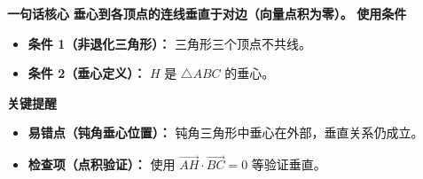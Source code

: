 \begin{summarybox}
	\textbf{\textcolor{CSummary}{一句话核心}}
	\textbf{垂心到各顶点的连线垂直于对边（向量点积为零）。}
	\medskip
	\textbf{\textcolor{CSummary}{使用条件}}
	\begin{itemize}[leftmargin=*, itemsep=0.5em, topsep=0.4em]
		\item \textbf{条件 1（非退化三角形）：} 三角形三个顶点不共线。
		\item \textbf{条件 2（垂心定义）：} $H$ 是 $\triangle ABC$ 的垂心。
	\end{itemize}
	\medskip
	\textbf{\textcolor{CSummary}{关键提醒}}
	\begin{itemize}[leftmargin=*, itemsep=0.5em, topsep=0.4em]
		\item \textbf{易错点（钝角垂心位置）：} 钝角三角形中垂心在外部，垂直关系仍成立。
		\item \textbf{检查项（点积验证）：} 使用 $\overrightarrow{AH}\cdot\overrightarrow{BC}=0$ 等验证垂直。
	\end{itemize}
\end{summarybox}
